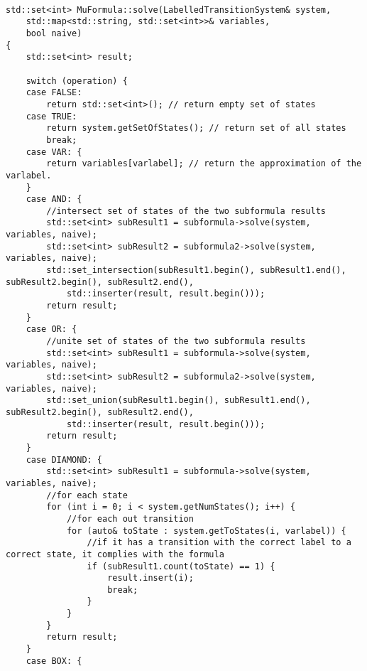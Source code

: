 \documentclass[10pt,a4paper]{article}
\begin{document}

\newpage
\appendix
{}
  
\begin{lstlisting}[caption=MuCalculus.cpp]

std::set<int> MuFormula::solve(LabelledTransitionSystem& system, 
	std::map<std::string, std::set<int>>& variables, 
	bool naive) 
{
    std::set<int> result;

    switch (operation) {
    case FALSE:
        return std::set<int>(); // return empty set of states
    case TRUE:
        return system.getSetOfStates(); // return set of all states
        break;
    case VAR: {
        return variables[varlabel]; // return the approximation of the varlabel.
    }
    case AND: {
        //intersect set of states of the two subformula results
        std::set<int> subResult1 = subformula->solve(system, variables, naive);
        std::set<int> subResult2 = subformula2->solve(system, variables, naive);
        std::set_intersection(subResult1.begin(), subResult1.end(), subResult2.begin(), subResult2.end(),
            std::inserter(result, result.begin()));
        return result;
    }
    case OR: {
        //unite set of states of the two subformula results
        std::set<int> subResult1 = subformula->solve(system, variables, naive);
        std::set<int> subResult2 = subformula2->solve(system, variables, naive);
        std::set_union(subResult1.begin(), subResult1.end(), subResult2.begin(), subResult2.end(),
            std::inserter(result, result.begin()));
        return result;
    }
    case DIAMOND: {
        std::set<int> subResult1 = subformula->solve(system, variables, naive);
        //for each state
        for (int i = 0; i < system.getNumStates(); i++) {
            //for each out transition
            for (auto& toState : system.getToStates(i, varlabel)) {
                //if it has a transition with the correct label to a correct state, it complies with the formula
                if (subResult1.count(toState) == 1) {
                    result.insert(i);
                    break;
                }
            }
        }
        return result;
    }
    case BOX: {

\end{lstlisting}
\end{document}
